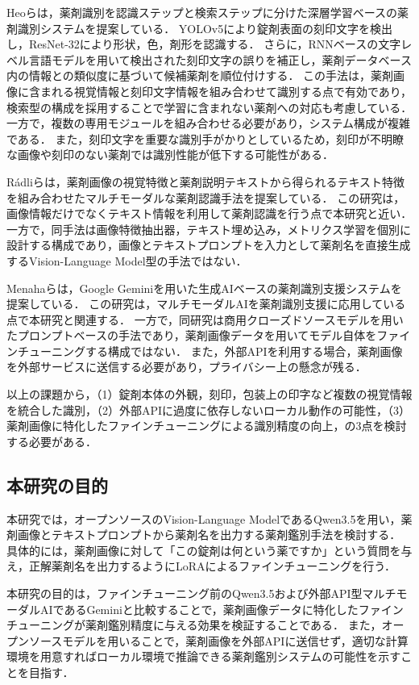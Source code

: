 \documentclass{jsarticle}
\begin{document}
Heoら\cite{heo2023pill}は，薬剤識別を認識ステップと検索ステップに分けた深層学習ベースの薬剤識別システムを提案している．
YOLOv5により錠剤表面の刻印文字を検出し，ResNet-32により形状，色，剤形を認識する．
さらに，RNNベースの文字レベル言語モデルを用いて検出された刻印文字の誤りを補正し，薬剤データベース内の情報との類似度に基づいて候補薬剤を順位付けする．
この手法は，薬剤画像に含まれる視覚情報と刻印文字情報を組み合わせて識別する点で有効であり，検索型の構成を採用することで学習に含まれない薬剤への対応も考慮している．
一方で，複数の専用モジュールを組み合わせる必要があり，システム構成が複雑である．
また，刻印文字を重要な識別手がかりとしているため，刻印が不明瞭な画像や刻印のない薬剤では識別性能が低下する可能性がある．

Rádliら\cite{radli2024metric}は，薬剤画像の視覚特徴と薬剤説明テキストから得られるテキスト特徴を組み合わせたマルチモーダルな薬剤認識手法を提案している．
この研究は，画像情報だけでなくテキスト情報を利用して薬剤認識を行う点で本研究と近い．
一方で，同手法は画像特徴抽出器，テキスト埋め込み，メトリクス学習を個別に設計する構成であり，画像とテキストプロンプトを入力として薬剤名を直接生成するVision-Language Model型の手法ではない．

Menahaら\cite{gemini2024pill}は，Google Geminiを用いた生成AIベースの薬剤識別支援システムを提案している．
この研究は，マルチモーダルAIを薬剤識別支援に応用している点で本研究と関連する．
一方で，同研究は商用クローズドソースモデルを用いたプロンプトベースの手法であり，薬剤画像データを用いてモデル自体をファインチューニングする構成ではない．
また，外部APIを利用する場合，薬剤画像を外部サービスに送信する必要があり，プライバシー上の懸念が残る．

以上の課題から，（1）錠剤本体の外観，刻印，包装上の印字など複数の視覚情報を統合した識別，（2）外部APIに過度に依存しないローカル動作の可能性，（3）薬剤画像に特化したファインチューニングによる識別精度の向上，の3点を検討する必要がある．

\subsection{本研究の目的}

本研究では，オープンソースのVision-Language ModelであるQwen3.5を用い，薬剤画像とテキストプロンプトから薬剤名を出力する薬剤鑑別手法を検討する．
具体的には，薬剤画像に対して「この錠剤は何という薬ですか」という質問を与え，正解薬剤名を出力するようにLoRAによるファインチューニングを行う．

本研究の目的は，ファインチューニング前のQwen3.5および外部API型マルチモーダルAIであるGeminiと比較することで，薬剤画像データに特化したファインチューニングが薬剤鑑別精度に与える効果を検証することである．
また，オープンソースモデルを用いることで，薬剤画像を外部APIに送信せず，適切な計算環境を用意すればローカル環境で推論できる薬剤鑑別システムの可能性を示すことを目指す．
\end{document}
